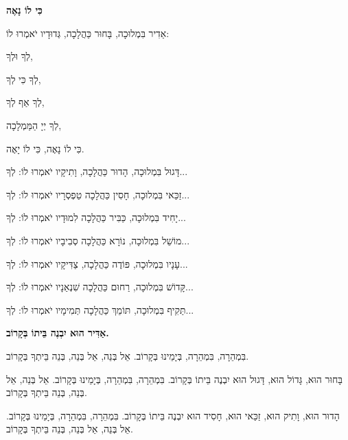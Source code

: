 
\setlength{\parindent}{0em}

\begin{center}
{\large \bfseries
כִּי לוֹ נָאֶה
}

אַדִיר בִּמְלוּכָה, בָּחוּר כַּהֲלָכָה, גְּדוּדָיו יֹאמְרוּ לוֹ: 

\vspace{0.5em}

לְךָ וּלְךָ, 

לְךָ כִּי לְךָ, 

לְךָ אַף לְךָ, 

לְךָ יְיָ הַמַּמְלָכָה, 

כִּי לוֹ נָאֶה, כִּי לוֹ יָאֶה.

\vspace{0.5em}

דָּגוּל בִּמְלוּכָה, הָדוּר כַּהֲלָכָה, וָתִיקָיו יֹאמְרוּ לוֹ: 
\hfill
לְךָ...

זַכַּאי בִּמְלוּכָה, חָסִין כַּהֲלָכָה טַפְסְרָיו יֹאמְרוּ לוֹ: 
\hfill
לְךָ...

יָחִיד בִּמְלוּכָה, כַּבִּיר כַּהֲלָכָה לִמוּדָיו יֹאמְרוּ לוֹ: 
\hfill
לְךָ...

מוֹשֵׁל בִּמְלוּכָה, נוֹרָא כַּהֲלָכָה סְבִיבָיו יֹאמְרוּ לוֹ: 
\hfill
לְךָ...

עָנָיו בִּמְלוּכָה, פּוֹדֶה כַּהֲלָכָה, צַדִּיקָיו יֹאמְרוּ לוֹ: 
\hfill
לְךָ...

קָּדוֹשׁ בִּמְלוּכָה, רַחוּם כַּהֲלָכָה שִׁנְאַנָיו יֹאמְרוּ לוֹ: 
\hfill
לְךָ...

תַּקִיף בִּמְלוּכָה, תּוֹמֵךְ כַּהֲלָכָה תְּמִימָיו יֹאמְרוּ לוֹ: 
\hfill
לְךָ...
\end{center}
\break

\begin{center}
{\large \bfseries
אַדִּיר הוּא יִבְנֶה בֵּיתוֹ בְּקָרוֹב.
}
\end{center}

בִּמְהֵרָה, בִּמְהֵרָה, בְּיָמֵינוּ בְּקָרוֹב. אֵל בְּנֵה, אֵל בְּנֵה, בְּנֵה בֵּיתְךָ בְּקָרוֹב.

\vspace{1em}

בָּחוּר הוּא, גָּדוֹל הוּא, דָּגוּל הוּא יִבְנֶה בֵּיתוֹ בְּקָרוֹב. בִּמְהֵרָה, בִּמְהֵרָה, בְּיָמֵינוּ בְּקָרוֹב. אֵל בְּנֵה, אֵל בְּנֵה, בְּנֵה בֵּיתְךָ בְּקָרוֹב.

\vspace{1em}

הָדוּר הוּא, וָתִיק הוּא, זַכַּאי הוּא, חָסִיד הוּא יִבְנֶה בֵּיתוֹ בְּקָרוֹב. בִּמְהֵרָה, בִּמְהֵרָה, בְּיָמֵינוּ בְּקָרוֹב. אֵל בְּנֵה, אֵל בְּנֵה, בְּנֵה בֵּיתְךָ בְּקָרוֹב.

